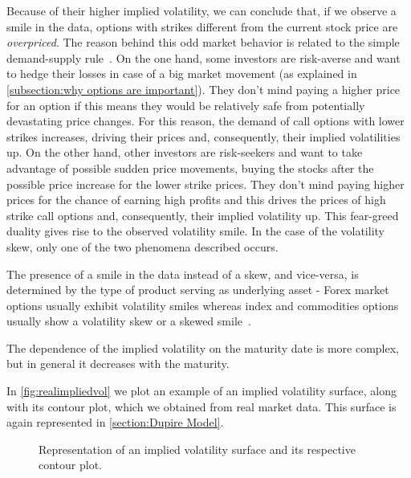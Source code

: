 Because of their higher implied volatility, we can conclude that, if we observe a smile in the data, options with strikes different from the current stock price are \emph{overpriced}.
The reason behind this odd market behavior is related to the simple demand-supply rule~\citep{Wilmott3}. On the one hand, some investors are risk-averse and want to hedge their losses in case of a big market movement (as explained in \autoref{subsection:why options are important}). They don't mind paying a higher price for an option if this means they would be relatively safe from potentially devastating price changes. For this reason, the demand of call options with lower strikes increases, driving their prices and, consequently, their implied volatilities up. On the other hand, other investors are risk-seekers and want to take advantage of possible sudden price movements, buying the stocks after the possible price increase for the lower strike prices. They don't mind paying higher prices for the chance of earning high profits and this drives the prices of high strike call options and, consequently, their implied volatility up. This fear-greed duality gives rise to the observed volatility smile. 
In the case of the volatility skew, only one of the two phenomena described occurs.


The presence of a smile in the data instead of a skew, and vice-versa, is determined by the type of product serving as underlying asset - Forex market options usually exhibit volatility smiles whereas index and commodities options usually show a volatility skew or a skewed smile~\citep{Wilmott3}.

The dependence of the implied volatility on the maturity date is more complex, but in general it decreases with the maturity.

In \autoref{fig:realimpliedvol} we plot an example of an implied volatility surface, along with its contour plot, which we obtained from real market data. This surface is again represented in \autoref{section:Dupire Model}. 
\begin{figure}[!htb]
  \begin{subfigmatrix}{2}
  \end{subfigmatrix}
  \caption[Representation of an implied volatility surface and its respective contour plot.]{Representation of an implied volatility surface and its respective contour plot.}
  \label{fig:realimpliedvol}
\end{figure}

